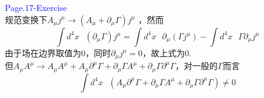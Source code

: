 \documentclass[12pt, a4paper, oneside]{ctexart}
\begin{document}
\textcolor{blue}{Page.17-Exercise}\\
规范变换下${{A}_{\mu }}{{j}^{\mu }}\to \left( {{A}_{\mu }}+{{\partial }_{\mu }}\Gamma  \right){{j}^{\mu }}$
，然而
\[\int{{{d}^{4}}x\text{ }\left( {{\partial }_{\mu }}\Gamma  \right){{j}^{\mu }}}=\int{{{d}^{4}}x\text{ }{{\partial }_{\mu }}\left( \Gamma {{j}^{\mu }} \right)}-\int{{{d}^{4}}}x\text{ }\Gamma {{\partial }_{\mu }}{{j}^{\mu }}\]
由于场在边界取值为0，同时${{\partial }_{\mu }}{{j}^{\mu }}=0$，故上式为0.\\
但${{A}_{\mu }}{{A}^{\mu }}\to {{A}_{\mu }}{{A}^{\mu }}+{{A}_{\mu }}{{\partial }^{\mu }}\Gamma +{{\partial }_{\mu }}\Gamma {{A}^{\mu }}+{{\partial }_{\mu }}\Gamma {{\partial }^{\mu }}\Gamma $，对一般的$\Gamma$而言
\[\int{{{d}^{4}}x\text{ }\left( {{A}_{\mu }}{{\partial }^{\mu }}\Gamma +{{\partial }_{\mu }}\Gamma {{A}^{\mu }}+{{\partial }_{\mu }}\Gamma {{\partial }^{\mu }}\Gamma  \right)\ne 0}\]
\end{document}
